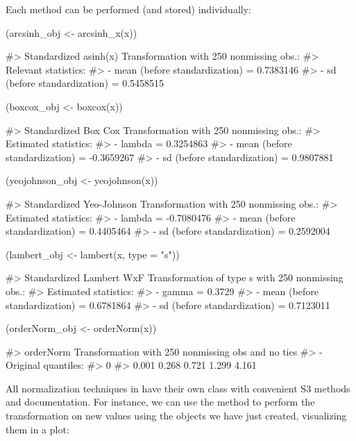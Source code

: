 Each method can be performed (and stored) individually:

\begin{Schunk}
\begin{Sinput}
(arcsinh_obj <- arcsinh_x(x))
\end{Sinput}
\begin{Soutput}
#> Standardized asinh(x) Transformation with 250 nonmissing obs.:
#>  Relevant statistics:
#>  - mean (before standardization) = 0.7383146 
#>  - sd (before standardization) = 0.5458515
\end{Soutput}
\begin{Sinput}
(boxcox_obj <- boxcox(x))
\end{Sinput}
\begin{Soutput}
#> Standardized Box Cox Transformation with 250 nonmissing obs.:
#>  Estimated statistics:
#>  - lambda = 0.3254863 
#>  - mean (before standardization) = -0.3659267 
#>  - sd (before standardization) = 0.9807881
\end{Soutput}
\begin{Sinput}
(yeojohnson_obj <- yeojohnson(x))
\end{Sinput}
\begin{Soutput}
#> Standardized Yeo-Johnson Transformation with 250 nonmissing obs.:
#>  Estimated statistics:
#>  - lambda = -0.7080476 
#>  - mean (before standardization) = 0.4405464 
#>  - sd (before standardization) = 0.2592004
\end{Soutput}
\begin{Sinput}
(lambert_obj <- lambert(x, type = "s"))
\end{Sinput}
\begin{Soutput}
#> Standardized Lambert WxF Transformation of type s with 250 nonmissing obs.:
#>  Estimated statistics:
#>  - gamma = 0.3729
#>  - mean (before standardization) = 0.6781864 
#>  - sd (before standardization) = 0.7123011
\end{Soutput}
\begin{Sinput}
(orderNorm_obj <- orderNorm(x))
\end{Sinput}
\begin{Soutput}
#> orderNorm Transformation with 250 nonmissing obs and no ties 
#>  - Original quantiles:
#>    0%
#> 0.001 0.268 0.721 1.299 4.161
\end{Soutput}
\end{Schunk}

All normalization techniques in  have their own
class with convenient S3 methods and documentation. For instance, we can
use the  method to perform the transformation on new
values using the objects we have just created, visualizing them in a
plot:

